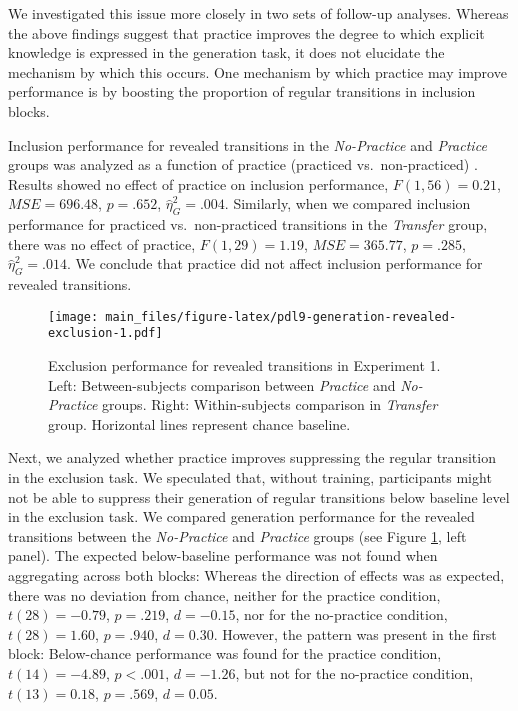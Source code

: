 \documentclass[man]{apa6}
\theoremstyle{definition}
\theoremstyle{definition}
\theoremstyle{definition}
\theoremstyle{remark}
\begin{document}
We investigated this issue more closely in two sets of follow-up
analyses. Whereas the above findings suggest that practice improves the
degree to which explicit knowledge is expressed in the generation task,
it does not elucidate the mechanism by which this occurs. One mechanism
by which practice may improve performance is by boosting the proportion
of regular transitions in inclusion blocks.

Inclusion performance for revealed transitions in the \emph{No-Practice}
and \emph{Practice} groups was analyzed as a function of practice
(practiced vs.~non-practiced) . Results showed no effect of practice on
inclusion performance, \(F(1, 56) = 0.21\), \(\mathit{MSE} = 696.48\),
\(p = .652\), \(\hat{\eta}^2_G = .004\). Similarly, when we compared
inclusion performance for practiced vs.~non-practiced transitions in the
\emph{Transfer} group, there was no effect of practice,
\(F(1, 29) = 1.19\), \(\mathit{MSE} = 365.77\), \(p = .285\),
\(\hat{\eta}^2_G = .014\). We conclude that practice did not affect
inclusion performance for revealed transitions.

\begin{figure}
\centering
\texttt{[image: main\_files/figure-latex/pdl9-generation-revealed-exclusion-1.pdf]}
\caption{\label{fig:pdl9-generation-revealed-exclusion}Exclusion performance
for revealed transitions in Experiment 1. Left: Between-subjects
comparison between \emph{Practice} and \emph{No-Practice} groups. Right:
Within-subjects comparison in \emph{Transfer} group. Horizontal lines
represent chance baseline.}
\end{figure}

Next, we analyzed whether practice improves suppressing the regular
transition in the exclusion task. We speculated that, without training,
participants might not be able to suppress their generation of regular
transitions below baseline level in the exclusion task. We compared
generation performance for the revealed transitions between the
\emph{No-Practice} and \emph{Practice} groups (see Figure
\ref{fig:pdl9-generation-revealed-exclusion}, left panel). The expected
below-baseline performance was not found when aggregating across both
blocks: Whereas the direction of effects was as expected, there was no
deviation from chance, neither for the practice condition,
\(t(28) = -0.79\), \(p = .219\), \(d = -0.15\), nor for the no-practice
condition, \(t(28) = 1.60\), \(p = .940\), \(d = 0.30\). However, the
pattern was present in the first block: Below-chance performance was
found for the practice condition, \(t(14) = -4.89\), \(p < .001\),
\(d = -1.26\), but not for the no-practice condition, \(t(13) = 0.18\),
\(p = .569\), \(d = 0.05\).
\end{document}
